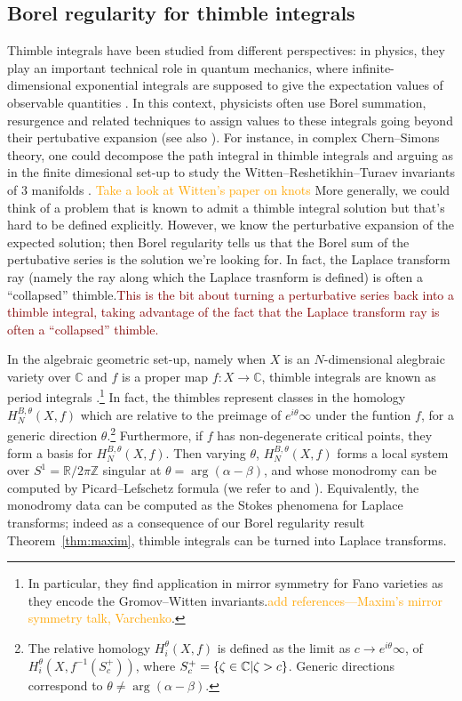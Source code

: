 \documentclass{article}
\let\Re\relax
\DeclareMathOperator{\Re}{Re}
\newcommand{\Z}{\mathbb{Z}}
\newcommand{\R}{\mathbb{R}}
\newcommand{\C}{\mathbb{C}}
\theoremstyle{definition}
\theoremstyle{plain}
\begin{document}
\subsection{Borel regularity for thimble integrals}
%
Thimble integrals have been studied from different perspectives: in physics, they play an important technical role in quantum mechanics, where infinite-dimensional exponential integrals are supposed to give the expectation values of observable quantities \cite{dunne-unsal2,dunne-unsal,Fauvet_Menous_Queva,Tanizaki:2014tua}. In this context, physicists often use Borel summation, resurgence and related techniques to assign values to these integrals going beyond their pertubative expansion (see also \cite{Berry_Howls,Berry1991,costin_kruskal,Howls97,Howls,pham1988resurgence}). For instance, in complex Chern--Simons theory, one could decompose the path integral in thimble integrals and arguing as in the finite dimesional set-up to study the Witten--Reshetikhin--Turaev invariants of $3$ manifolds \cite{gukov-marino-purtrov-resurgence,Witten}. \textcolor{orange}{Take a look at Witten's paper on knots} More generally, we could think of a problem that is known to admit a thimble integral solution but that's hard to be defined explicitly. However, we know the perturbative expansion of the expected solution; then Borel regularity tells us that the Borel sum of the pertubative series is the solution we're looking for. In fact, the Laplace transform ray (namely the ray along which the Laplace trasnform is defined) is often a ``collapsed'' thimble.\textcolor{Maroon}{This is the bit about turning a perturbative series back into a thimble integral, taking advantage of the fact that the Laplace transform ray is often a ``collapsed'' thimble.}

In the algebraic geometric set-up, namely when $X$ is an $N$-dimensional alegbraic variety over $\C$ and $f$ is a proper map $f\colon X\to\C$, thimble integrals are known as period integrals \cite{deligne2007singularites,Maxim_lectures,pham}.\footnote{In particular, they find application in mirror symmetry for Fano varieties as they encode the Gromov--Witten invariants.\textcolor{orange}{add references---Maxim's mirror symmetry talk, Varchenko}.} In fact, the thimbles represent classes in the homology $H^{B,\theta}_N(X,f)$ which are relative to the preimage of $e^{i\theta}\infty$ under the funtion $f$, for a generic direction $\theta$.\footnote{The relative homology $H_i^{\theta}(X,f)$ is defined as the limit as $c\to e^{i\theta}\infty$, of $H_i^{\theta}(X,f^{-1}(S_c^+))$, where $S_c^+=\lbrace \zeta\in\C \vert \Re \zeta> c\rbrace$. Generic directions correspond to $\theta\neq \arg (\alpha-\beta)$. } Furthermore, if $f$ has non-degenerate critical points, they form a basis for $H_N^{B,\theta}(X,f)$. Then varying $\theta$, $H_N^{B,\theta}(X,f)$ forms a local system over $S^1=\R/2\pi \Z$ singular at $\theta=\arg(\alpha-\beta)$, and whose monodromy can be computed by Picard--Lefschetz formula (we refer to \cite[Section~1]{Arnold} and \cite[Section~3.3, Part II]{pham}). Equivalently, the monodromy data can be computed as the Stokes phenomena for Laplace transforms; indeed as a consequence of our Borel regularity result Theorem~\ref{thm:maxim}, thimble integrals can be turned into Laplace transforms.  
\end{document}
